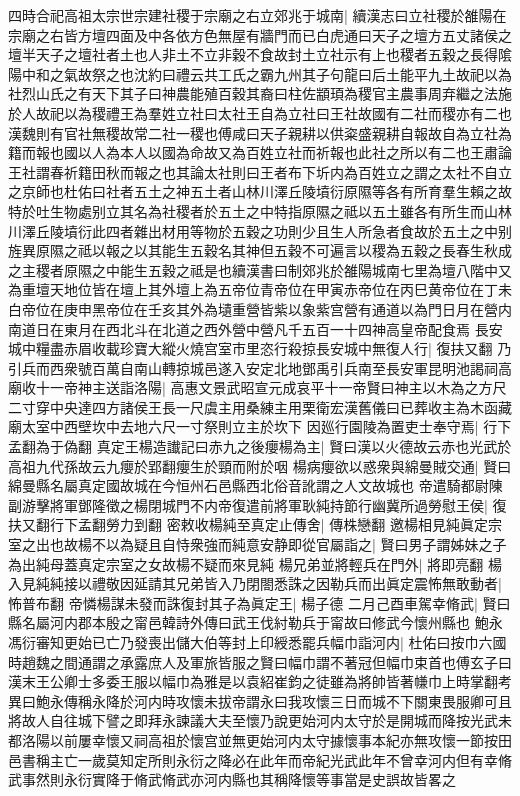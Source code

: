 四時合祀高祖太宗世宗建社稷于宗廟之右立郊兆于城南|{
	續漢志曰立社稷於雒陽在宗廟之右皆方壇四面及中各依方色無屋有牆門而已白虎通曰天子之壇方五丈諸侯之壇半天子之壇社者土也人非土不立非穀不食故封土立社示有上也稷者五穀之長得隂陽中和之氣故祭之也沈約曰禮云共工氏之霸九州其子句龍曰后土能平九土故祀以為社烈山氏之有天下其子曰神農能殖百穀其裔曰柱佐顓頊為稷官主農事周弃繼之法施於人故祀以為稷禮王為羣姓立社曰太社王自為立社曰王社故國有二社而稷亦有二也漢魏則有官社無稷故常二社一稷也傅咸曰天子親耕以供粢盛親耕自報故自為立社為籍而報也國以人為本人以國為命故又為百姓立社而祈報也此社之所以有二也王肅論王社謂春祈籍田秋而報之也其論太社則曰王者布下圻内為百姓立之謂之太社不自立之京師也杜佑曰社者五土之神五土者山林川澤丘陵墳衍原隰等各有所育羣生賴之故特於吐生物處别立其名為社稷者於五土之中特指原隰之祗以五土雖各有所生而山林川澤丘陵墳衍此四者雜出材用等物於五穀之功則少且生人所急者食故於五土之中别旌異原隰之祗以報之以其能生五穀名其神但五穀不可遍言以稷為五穀之長春生秋成之主稷者原隰之中能生五穀之祗是也續漢書曰制郊兆於雒陽城南七里為壇八階中又為重壇天地位皆在壇上其外壇上為五帝位青帝位在甲寅赤帝位在丙巳黄帝位在丁未白帝位在庚申黑帝位在壬亥其外為壝重營皆紫以象紫宫營有通道以為門日月在營内南道日在東月在西北斗在北道之西外營中營凡千五百一十四神高皇帝配食焉}
長安城中糧盡赤眉收載珍寶大縱火燒宫室市里恣行殺掠長安城中無復人行|{
	復扶又翻}
乃引兵而西衆號百萬自南山轉掠城邑遂入安定北地鄧禹引兵南至長安軍昆明池謁祠高廟收十一帝神主送詣洛陽|{
	高惠文景武昭宣元成哀平十一帝賢曰神主以木為之方尺二寸穿中央達四方諸侯王長一尺虞主用桑練主用栗衛宏漢舊儀曰已葬收主為木函藏廟太室中西壁坎中去地六尺一寸祭則立主於坎下}
因廵行園陵為置吏士奉守焉|{
	行下孟翻為于偽翻}
真定王楊造䜟記曰赤九之後癭楊為主|{
	賢曰漢以火德故云赤也光武於高祖九代孫故云九癭於郢翻癭生於頸而附於咽}
楊病癭欲以惑衆與綿曼賊交通|{
	賢曰綿曼縣名屬真定國故城在今恒州石邑縣西北俗音訛謂之人文故城也}
帝遣騎都尉陳副游擊將軍鄧隆徵之楊閉城門不内帝復遣前將軍耿純持節行幽冀所過勞慰王侯|{
	復扶又翻行下孟翻勞力到翻}
密敕收楊純至真定止傳舍|{
	傳株戀翻}
邀楊相見純眞定宗室之出也故楊不以為疑且自恃衆強而純意安静即從官屬詣之|{
	賢曰男子謂姊妹之子為出純母蓋真定宗室之女故楊不疑而來見純}
楊兄弟並將輕兵在門外|{
	將即亮翻}
楊入見純純接以禮敬因延請其兄弟皆入乃閉閤悉誅之因勒兵而出眞定震怖無敢動者|{
	怖普布翻}
帝憐楊謀未發而誅復封其子為眞定王|{
	楊子德}
二月己酉車駕幸脩武|{
	賢曰縣名屬河内郡本殷之甯邑韓詩外傳曰武王伐紂勒兵于甯故曰修武今懷州縣也}
鮑永馮衍審知更始已亡乃發喪出儲大伯等封上印綬悉罷兵幅巾詣河内|{
	杜佑曰按巾六國時趙魏之間通謂之承露庶人及軍旅皆服之賢曰幅巾謂不著冠但幅巾束首也傅玄子曰漢末王公卿士多委王服以幅巾為雅是以袁紹崔鈞之徒雖為將帥皆著㡘巾上時掌翻考異曰鮑永傳稱永降於河内時攻懷未拔帝謂永曰我攻懷三日而城不下關東畏服卿可且將故人自往城下譬之即拜永諫議大夫至懷乃說更始河内太守於是開城而降按光武未都洛陽以前屢幸懷又祠高祖於懷宫並無更始河内太守據懷事本紀亦無攻懷一節按田邑書稱主亡一歲莫知定所則永衍之降必在此年而帝紀光武此年不曾幸河内但有幸脩武事然則永衍實降于脩武脩武亦河内縣也其稱降懷等事當是史誤故皆畧之}
